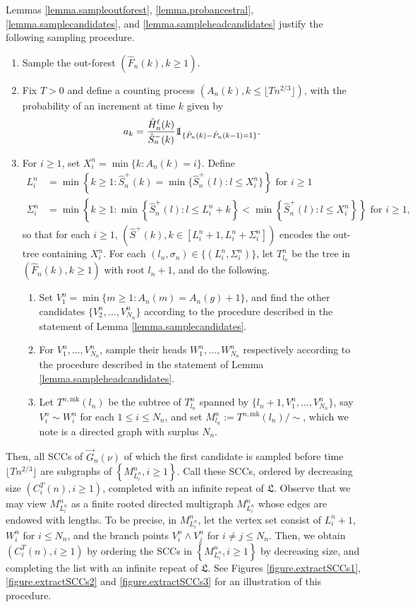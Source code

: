 Lemmas \ref{lemma.sampleoutforest}, \ref{lemma.probancestral}, \ref{lemma.samplecandidates}, and \ref{lemma.sampleheadcandidates} justify the following sampling procedure.
\begin{enumerate}
    \item Sample the out-forest $(\hat{F}_n(k),k\geq 1)$.
    \item Fix $T>0$ and define a counting process $(A_n(k),k\leq \lfloor Tn^{2/3}\rfloor)$, with the probability of an increment at time $k$ given by $$a_k=\frac{\hat{H}_n^\ell(k)}{\hat{S}_n^-(k)}\one_{\{\hat{P}_n(k)-\hat{P}_n(k-1)=1\}}.$$
    \item For $i\geq 1$, set $X_i^n=\min\{k:A_n(k)=i\}$. Define
\begin{align*}L_i^n&=\min\left\{k\geq 1:\hat{S}^{+}_n(k)=\min\{\hat{S}^{+}_n(l):l\leq X_i^n\}\right\}\text{ for }i\geq 1\\
\Sigma_i^n&=\min\left\{k \geq 1: \min\left\{\hat{S}^{+}_n(l):l\leq L_i^n+k\right\} < \min\left\{\hat{S}^{+}_n(l):l\leq X_i^n\right\}\right\}\text{ for }i\geq 1,
\end{align*}
so that for each $i\geq 1$, $\left(\hat{S}^+(k),k\in [L_i^n+1,L_i^n+\Sigma_i^n]\right)$ encodes the out-tree containing $X_i^n$. For each $(l_n,\sigma_n)\in \{(L_i^n,\Sigma_i^n)\}$, let $T^n_{l_n}$ be the tree in $(\hat{F}_n(k),k\geq 1)$ with root $l_n+1$, and do the following.
    \begin{enumerate}
    \item \label{item.procedure3} Set $V_1^n=\min\{m\geq 1:A_n(m)=A_n(g)+1\}$, and find the other candidates $\{V_2^n,\dots ,V_{N_n}^n\}$ according to the procedure described in the statement of Lemma \ref{lemma.samplecandidates}.
    \item \label{item.procedure4} For $V_1^n,\dots, V_{N_n}^n$, sample their heads $W_1^n,\dots ,W_{N_n}^n$ respectively according to the procedure described in the statement of Lemma \ref{lemma.sampleheadcandidates}.
    \item Let $T^{n,\text{mk}}(l_n)$ be the subtree of $T^n_{l_n}$ spanned by $\{l_n+1,V_1^n,\dots ,V_{N_n}^n\}$, say $V_i^n\sim W_i^n$ for each $1\leq i\leq N_n$, and set $M^n_{l_n}:=T^{n,\text{mk}}(l_n)/\sim$, which we note is a directed graph with surplus $N_n$. 
\end{enumerate}
\end{enumerate}
Then, all SCCs of $\vec{G}_n(\nu)$ of which the first candidate is sampled before time $\lfloor Tn^{2/3}\rfloor$ are subgraphs of $\left\{M^n_{L_i^n}, i\geq 1 \right\}$. Call these SCCs, ordered by decreasing size $(C_i^T(n),i\geq 1)$, completed with an infinite repeat of $\mathfrak{L}$. Observe that we may view $M^n_{L_i^n}$ as a finite rooted directed multigraph $M^n_{L_i^n}$ whose edges are endowed with lengths. To be precise, in  $M^n_{L_i^n}$, let the vertex set consist of $L_i^n+1$, $W_i^n$ for $i\leq N_n$, and the branch points $V_i^n\wedge V_j^n$ for $i\neq j\leq N_n$. Then, we obtain $(C_i^T(n),i\geq 1)$ by ordering the SCCs in $\left\{M^n_{L_i^n}, i\geq 1 \right\}$ by decreasing size, and completing the list with an infinite repeat of $\mathfrak{L}$. See Figures \ref{figure.extractSCCs1}, \ref{figure.extractSCCs2} and \ref{figure.extractSCCs3} for an illustration of this procedure.

